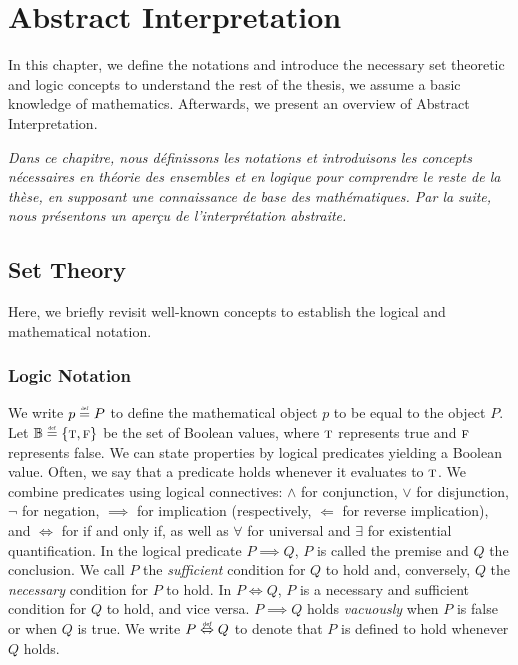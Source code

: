 


\setchapterpreamble[u]{\margintoc}


\chapter{Abstract Interpretation}


\marginemptybox{11.1cm}

In this chapter, we define the notations and introduce the necessary set theoretic and logic concepts to understand the rest of the thesis, we assume a basic knowledge of mathematics.
Afterwards, we present an overview of Abstract Interpretation.

\frenchdiv

\emph{Dans ce chapitre, nous définissons les notations et introduisons les concepts nécessaires en théorie des ensembles et en logique pour comprendre le reste de la thèse, en supposant une connaissance de base des mathématiques. Par la suite, nous présentons un aperçu de l'interprétation abstraite.}

\section{Set Theory}

Here, we briefly revisit well-known concepts to establish the logical and mathematical notation.

\subsection{Logic Notation}

We write $p \defeq P$ to define the mathematical object $p$ to be equal to the object $P$.
Let $\B \defeq \{\true, \false\}$ be the set of Boolean values, where $\textsc{t}$ represents true and $\textsc{f}$ represents false.
We can state properties by logical predicates yielding a Boolean value.
Often, we say that a predicate holds whenever it evaluates to $\textsc{t}$.
We combine predicates using logical connectives: $\land$ for conjunction, $\lor$ for disjunction, $\neg$ for negation, $\implies$ for implication (respectively, $\Leftarrow$ for reverse implication), and $\iff$ for if and only if, as well as $\forall$ for universal and $\exists$ for existential quantification.
In the logical predicate $P \implies Q$, $P$ is called the premise and $Q$ the conclusion.
We call $P$ the \emph{sufficient} condition for $Q$ to hold and, conversely, $Q$ the \emph{necessary} condition for $P$ to hold.
In $P \iff Q$, $P$ is a necessary and sufficient condition for $Q$ to hold, and vice versa.
$P \implies Q$ holds \emph{vacuously} when $P$ is false or when $Q$ is true.
We write $P \defiff Q$ to denote that $P$ is defined to hold whenever $Q$ holds.

